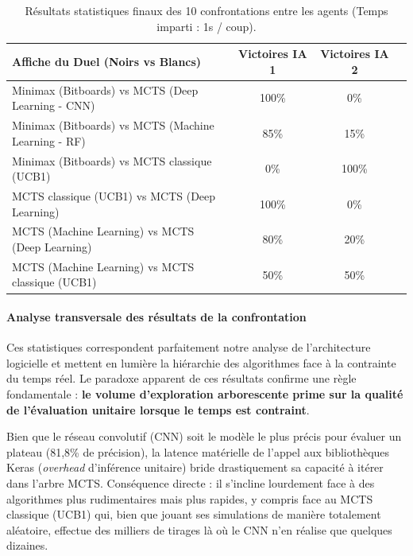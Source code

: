 \documentclass[a4paper]{article}
\begin{document}
\begin{table}[H]
    \centering
    \renewcommand{\arraystretch}{1.2}
    \begin{tabular}{|l|c|c|c|}
        \hline
        \textbf{Affiche du Duel (Noirs vs Blancs)}          & \textbf{Victoires IA 1} & \textbf{Victoires IA 2} \\
        \hline
        Minimax (Bitboards) vs MCTS (Deep Learning - CNN)   & 100\%                   & 0\%                     \\
        \hline
        Minimax (Bitboards) vs MCTS (Machine Learning - RF) & 85\%                    & 15\%                    \\
        \hline
        Minimax (Bitboards) vs MCTS classique (UCB1)        & 0\%                     & 100\%                   \\
        \hline
        MCTS classique (UCB1) vs MCTS (Deep Learning)       & 100\%                   & 0\%                     \\
        \hline
        MCTS (Machine Learning) vs MCTS (Deep Learning)     & 80\%                    & 20\%                    \\
        \hline
        MCTS (Machine Learning) vs MCTS classique (UCB1)    & 50\%                    & 50\%                    \\
        \hline
    \end{tabular}
    \caption{Résultats statistiques finaux des 10 confrontations entre les agents (Temps imparti : 1s / coup).}
    \label{tab:ia_tournament_complet}
\end{table}

\paragraph{Analyse transversale des résultats de la confrontation}
Ces statistiques correspondent parfaitement notre analyse de l'architecture logicielle et mettent en lumière la hiérarchie des algorithmes face à la contrainte du temps réel. Le paradoxe apparent de ces résultats confirme une règle fondamentale : \textbf{le volume d'exploration arborescente prime sur la qualité de l'évaluation unitaire lorsque le temps est contraint}.

Bien que le réseau convolutif (CNN) soit le modèle le plus précis pour évaluer un plateau (81,8\% de précision), la latence matérielle de l'appel aux bibliothèques Keras (\textit{overhead} d'inférence unitaire) bride drastiquement sa capacité à itérer dans l'arbre MCTS. Conséquence directe : il s'incline lourdement face à des algorithmes plus rudimentaires mais plus rapides, y compris face au MCTS classique (UCB1) qui, bien que jouant ses simulations de manière totalement aléatoire, effectue des milliers de tirages là où le CNN n'en réalise que quelques dizaines.
\end{document}
